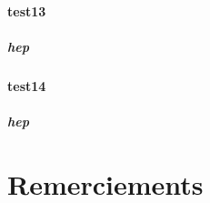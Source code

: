 \documentclass[a4paper,twoside,final]{book} %
\theoremstyle{definition}
\newcommand{\specialchap}[1]{%
\chapter{#1}%
\pagestyle{prefacestyle}%
\renewcommand\chaptername{#1}%
}
\begin{document}
\subsubsection{test13}\paragraph{hep}
\subsubsection{test14}\paragraph{hep}

\specialchap{Remerciements} %





%
%
\end{document}

